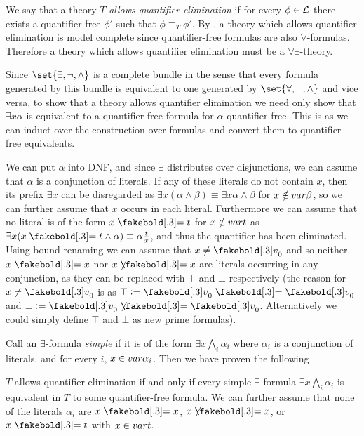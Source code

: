 We say that a theory $T$ {\it allows quantifier elimination} if for every $\phi\in{\cal L}$ there exists a quantifier-free $\phi'$ such that $\phi\equiv_T\phi'$.
By , a theory which allows quantifier elimination is model complete since quantifier-free formulas are also $\forall$-formulas.
Therefore a theory which allows quantifier elimination must be a $\forall\exists$-theory.

Since $\set{\exists,\neg,\land}$ is a complete bundle in the sense that every formula generated by this bundle is equivalent to one generated by $\set{\forall,\neg,\land}$ and vice versa, to show that a
theory allows quantifier elimination we need only show that $\exists x\alpha$ is equivalent to a quantifier-free formula for $\alpha$ quantifier-free.
This is as we can induct over the construction over formulas and convert them to quantifier-free equivalents.

We can put $\alpha$ into DNF, and since $\exists$ distributes over disjunctions, we can assume that $\alpha$ is a conjunction of literals.
If any of these literals do not contain $x$, then its prefix $\exists x$ can be disregarded as $\exists x(\alpha\land\beta)\equiv\exists x\alpha\land\beta$ for $x\notin{\sl var}\beta$, so we can further assume
that $x$ occurs in each literal.
Furthermore we can assume that no literal is of the form $x\eq t$ for $x\notin{\sl var} t$ as $\exists x(x\eq t\land\alpha)\equiv\alpha\frac tx$, and thus the quantifier has been eliminated.
Using bound renaming we can assume that $x\neq\v_0$ and so neither $x\eq x$ nor $x\neqb x$ are literals occurring in any conjunction, as they can be replaced with $\top$ and $\bot$ respectively (the reason
for $x\neq\v_0$ is as $\top\coloneqq\v_0\eq\v_0$ and $\bot\coloneqq\v_0\neqb\v_0$.
Alternatively we could simply define $\top$ and $\bot$ as new prime formulas).

Call an $\exists$-formula {\it simple} if it is of the form $\exists x\bigwedge_i\alpha_i$ where $\alpha_i$ is a conjunction of literals, and for every $i$, $x\in{\sl var}\alpha_i$.
Then we have proven the following

\bthrm

    $T$ allows quantifier elimination if and only if every simple $\exists$-formula $\exists x\bigwedge_i\alpha_i$ is equivalent in $T$ to some quantifier-free formula.
    We can further assume that none of the literals $\alpha_i$ are $x\eq x$, $x\neqb x$, or $x\eq t$ with $x\in{\sl var} t$.

